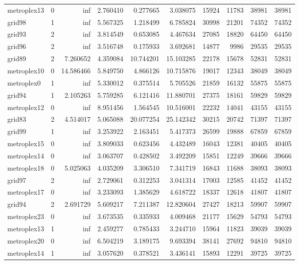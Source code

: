\begin{longtable}{|l|r|r|r|r|r|r|r|r|r|}
metroplex13 & 0 & inf & 2.760410 & 0.277665 & 3.038075 & 15924 & 11783 & 38981 & 38981 \\
grid98 & 1 & inf & 5.567325 & 1.218499 & 6.785824 & 30998 & 21201 & 74352 & 74352 \\
grid93 & 2 & inf & 3.814549 & 0.653085 & 4.467634 & 27085 & 18820 & 64450 & 64450 \\
grid96 & 2 & inf & 3.516748 & 0.175933 & 3.692681 & 14877 & 9986 & 29535 & 29535 \\
grid89 & 2 & 7.260652 & 4.359084 & 10.744201 & 15.103285 & 22178 & 15678 & 52831 & 52831 \\
metroplex10 & 0 & 14.586466 & 5.849750 & 4.866126 & 10.715876 & 19017 & 12343 & 38049 & 38049 \\
metroplex0 & 1 & inf & 5.330012 & 0.375514 & 5.705526 & 21859 & 16132 & 55875 & 55875 \\
grid94 & 1 & 2.105263 & 5.759285 & 6.121416 & 11.880701 & 27375 & 18161 & 59829 & 59829 \\
metroplex12 & 0 & inf & 8.951456 & 1.564545 & 10.516001 & 22232 & 14041 & 43155 & 43155 \\
grid83 & 2 & 4.514017 & 5.065088 & 20.077254 & 25.142342 & 30215 & 20742 & 71397 & 71397 \\
grid99 & 1 & inf & 3.253922 & 2.163451 & 5.417373 & 26599 & 19888 & 67859 & 67859 \\
metroplex15 & 0 & inf & 3.809033 & 0.623456 & 4.432489 & 16043 & 12381 & 40405 & 40405 \\
metroplex14 & 0 & inf & 3.063707 & 0.428502 & 3.492209 & 15851 & 12249 & 39666 & 39666 \\
metroplex18 & 0 & 5.025063 & 4.035209 & 3.306510 & 7.341719 & 16843 & 11688 & 38093 & 38093 \\
grid97 & 2 & inf & 2.729061 & 0.312253 & 3.041314 & 17003 & 12585 & 41452 & 41452 \\
metroplex17 & 0 & inf & 3.233093 & 1.385629 & 4.618722 & 18337 & 12618 & 41807 & 41807 \\
grid94 & 2 & 2.691729 & 5.609217 & 7.211387 & 12.820604 & 27427 & 18213 & 59907 & 59907 \\
metroplex23 & 0 & inf & 3.673535 & 0.335933 & 4.009468 & 21177 & 15629 & 54793 & 54793 \\
metroplex13 & 1 & inf & 2.459277 & 0.785433 & 3.244710 & 15964 & 11823 & 39039 & 39039 \\
metroplex20 & 0 & inf & 6.504219 & 3.189175 & 9.693394 & 38141 & 27692 & 94810 & 94810 \\
metroplex14 & 1 & inf & 3.057620 & 0.378521 & 3.436141 & 15893 & 12291 & 39725 & 39725 \\

\end{longtable}
